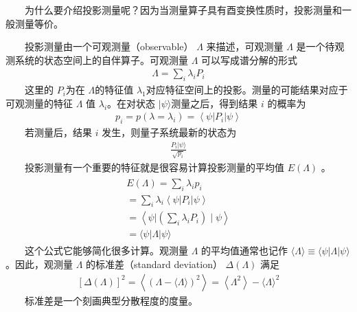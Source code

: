 \documentclass[a4paper,11pt,english]{sphinxmanual}
\begin{document}
\sphinxAtStartPar
{}

\sphinxAtStartPar
  为什么要介绍投影测量呢？因为当测量算子具有酉变换性质时，投影测量和一般测量等价。

\sphinxAtStartPar
  投影测量由一个可观测量（observable） \(\Lambda\) 来描述，可观测量 \(\Lambda\) 是一个待观测系统的状态空间上的自伴算子。可观测量 \(\Lambda\) 可以写成谱分解的形式
\begin{equation*}
\begin{split}\Lambda=\sum_{i} \lambda_{i} P_{i}\end{split}
\end{equation*}
\sphinxAtStartPar
  这里的 \(P_i\) ​为在 \(\Lambda\) ​的特征值 \(\lambda_{1}\) ​对应特征空间上的投影。测量的可能结果对应于可观测量的特征 \(\Lambda\) 值 \(\lambda_{i}\) ​。在对状态 \(|\psi\rangle\) ​测量之后，得到结果  \(i\) 的概率为
\begin{equation*}
\begin{split}p_{i}=p\left(\lambda=\lambda_{i}\right)=\left\langle\psi\left|P_{i}\right| \psi\right\rangle\end{split}
\end{equation*}
\sphinxAtStartPar
  若测量后，结果 \(i\) 发生，则量子系统最新的状态为
\begin{equation*}
\begin{split}\frac{P_{i}|\psi\rangle}{\sqrt{p_{i}}}\end{split}
\end{equation*}
\sphinxAtStartPar
  投影测量有一个重要的特征就是很容易计算投影测量的平均值 \(E(\Lambda)\) 。
\begin{equation*}
\begin{split}\begin{array}{r} E(\Lambda)=\sum_{i} \lambda_{i} p_{i} \\ =\sum_{i} \lambda_{i}\left\langle\psi\left|P_{i}\right| \psi\right\rangle \\ =\left\langle\psi|\left(\sum_{i} \lambda_{i} P_{i}\right) \mid \psi\right\rangle \\ =\langle\psi|\Lambda| \psi\rangle \end{array}\end{split}
\end{equation*}
\sphinxAtStartPar
  这个公式它能够简化很多计算。观测量 \(\Lambda\) 的平均值通常也记作 \(\langle\Lambda\rangle \equiv\langle\psi|\Lambda| \psi\rangle\) 。因此，观测量 \(\Lambda\) 的标准差（standard deviation） \(\Delta(\Lambda)\) 满足
\begin{equation*}
\begin{split}[\Delta(\Lambda)]^{2}=\left\langle(\Lambda-\langle\Lambda\rangle)^{2}\right\rangle=\left\langle\Lambda^{2}\right\rangle-\langle\Lambda\rangle^{2}\end{split}
\end{equation*}
\sphinxAtStartPar
  标准差是一个刻画典型分散程度的度量。
\end{document}
